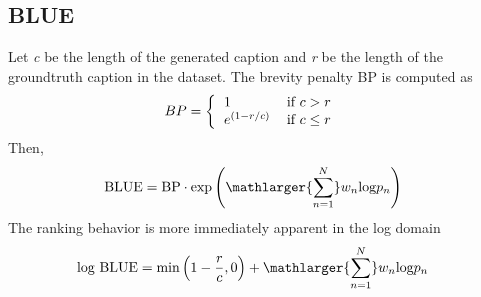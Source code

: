 \subsection{BLUE}
Let \textit{c} be the length of the generated caption and \textit{r} be the length of the groundtruth caption in the dataset. The brevity penalty BP is computed as
\begin{align}
	BP &= \left\{
		\begin{tabular}{l l}
			1 & if $c > r$ \\
			$e^{\left(1 - r/c\right)}$ & if $c \leq r$
		\end{tabular}
	\right.
\end{align}
Then,
	\begin{align}
		\centering
		\text{BLUE} &= \text{BP} \cdot \text{exp} \left( \mathlarger{ \sum^N_{n=1} } w_n \text{log} p_n \right) 
	\end{align}
The ranking behavior is more immediately apparent in the log domain
\begin{align*}
	\text{log BLUE} &= \text{min} \left(1 - \frac{r}{c}, 0\right) + \mathlarger{\sum^N_{n=1}} w_n\text{log}p_n 
\end{align*}


